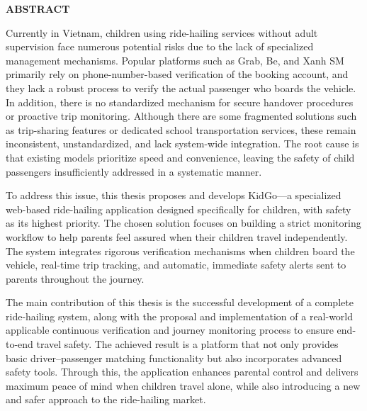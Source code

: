 \documentclass[../DoAn.tex]{subfiles}
\begin{document}
\begin{center}
    \Large{\textbf{ABSTRACT}}\\
\end{center}
\vspace{1cm}
Currently in Vietnam, children using ride-hailing services without adult supervision face numerous potential risks due to the lack of specialized management mechanisms. Popular platforms such as Grab, Be, and Xanh SM primarily rely on phone-number-based verification of the booking account, and they lack a robust process to verify the actual passenger who boards the vehicle. In addition, there is no standardized mechanism for secure handover procedures or proactive trip monitoring. Although there are some fragmented solutions such as trip-sharing features or dedicated school transportation services, these remain inconsistent, unstandardized, and lack system-wide integration. The root cause is that existing models prioritize speed and convenience, leaving the safety of child passengers insufficiently addressed in a systematic manner.

To address this issue, this thesis proposes and develops KidGo—a specialized web-based ride-hailing application designed specifically for children, with safety as its highest priority. The chosen solution focuses on building a strict monitoring workflow to help parents feel assured when their children travel independently. The system integrates rigorous verification mechanisms when children board the vehicle, real-time trip tracking, and automatic, immediate safety alerts sent to parents throughout the journey.

The main contribution of this thesis is the successful development of a complete ride-hailing system, along with the proposal and implementation of a real-world applicable continuous verification and journey monitoring process to ensure end-to-end travel safety. The achieved result is a platform that not only provides basic driver–passenger matching functionality but also incorporates advanced safety tools. Through this, the application enhances parental control and delivers maximum peace of mind when children travel alone, while also introducing a new and safer approach to the ride-hailing market.
\end{document}
